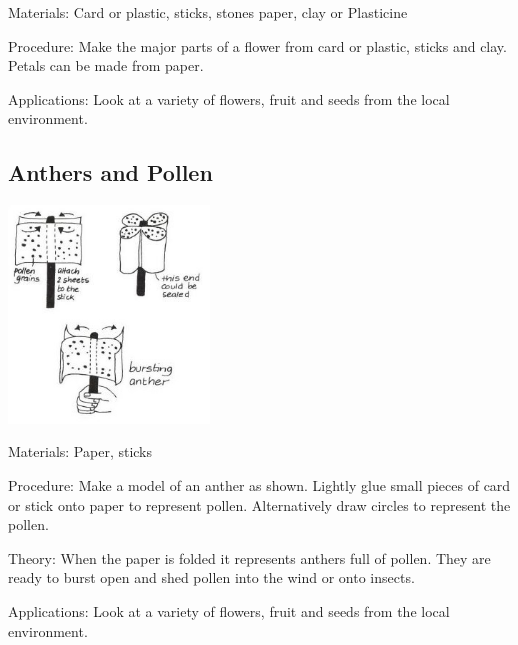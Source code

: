 \begin{multicols}{2}
\begin{description*}
\item[Materials:]{Card or plastic, sticks, stones paper, clay or Plasticine}
\item[Procedure:]{Make the major parts of a flower from card or plastic, sticks and clay.
Petals can be made from paper.}
\item[Applications:]{Look at a variety of flowers, fruit and seeds from the local environment.}
\end{description*}

\columnbreak

\subsection{Anthers and Pollen}

\begin{center}
\includegraphics[width=0.4\textwidth]{./img/vso/anthers-pollen.jpg}
\end{center}

\begin{description*}
\item[Materials:]{Paper, sticks}
\item[Procedure:]{Make a model of an anther as shown. Lightly glue small pieces of card
or stick onto paper to represent pollen. Alternatively draw circles to
represent the pollen. }
\item[Theory:]{When the paper is folded it represents anthers
full of pollen. They are ready to burst open and shed pollen into the
wind or onto insects.}
\item[Applications:]{Look at a variety of flowers, fruit and seeds from the local environment.}
\end{description*}


\end{multicols}
